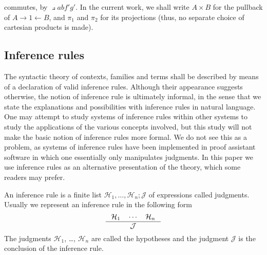 \documentclass{article}
\begin{document}
commutes, by $\pullback{a}{b}{f'}{g'}$. In the current work, we shall
write $A\times B$ for the pullback of $A\rightarrow 1\leftarrow B$, and
$\pi_1$ and $\pi_2$ for its projections (thus, no separate choice of
cartesian products is made).

\subsection{Inference rules}
The syntactic theory of contexts, families and terms shall be described by means
of a declaration of valid inference rules. Although their appearance suggests 
otherwise, the notion of inference rule is ultimately informal, in the sense
that we state the explanations and possibilities with inference rules in
natural language. One may attempt to study systems of inference rules within
other systems to study the applications of the various concepts involved, but
this study will not make the basic notion of inference rules more formal. We do
not see this as a problem, as systems of inference rules have been implemented
in proof assistant software in which one essentially only manipulates
judgments. In this paper we use inference rules as an alternative presentation
of the theory, which some readers may prefer. 

An inference rule is a finite list $\mathcal{H}_1,\ldots,\mathcal{H}_n;
\mathcal{J}$ of expressions called judgments. Usually we represent an inference
rule in the following form
\begin{equation*}
\inference{\mathcal{H}_1\quad\cdots\quad\mathcal{H}_n}{\mathcal{J}}
\end{equation*}
The judgments $\mathcal{H}_1$, \ldots, $\mathcal{H}_n$ are called the
hypotheses and the judgment $\mathcal{J}$ is the conclusion of the inference
rule.
\end{document}
